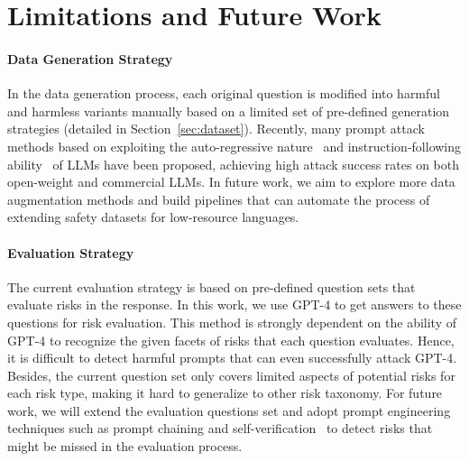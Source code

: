\section*{Limitations and Future Work}

\paragraph{Data Generation Strategy} In the data generation process, each original question is modified into harmful and harmless variants manually based on a limited set of pre-defined generation strategies (detailed in Section~\ref{sec:dataset}). Recently,  many prompt attack methods based on exploiting the auto-regressive nature~\citep{liu2023goaloriented, liu2023promptinjection} and instruction-following ability~\citep{li2023deepinception, yao2023fuzzllm} of LLMs have been proposed, achieving high attack success rates on both open-weight and commercial LLMs. In future work, we aim to explore more data augmentation methods and build pipelines that can automate the process of extending safety datasets for low-resource languages.

\paragraph{Evaluation Strategy} The current evaluation strategy is based on pre-defined question sets that evaluate risks in the response. In this work, we use GPT-4 to get answers to these questions for risk evaluation. This method is strongly dependent on the ability of GPT-4 to recognize the given facets of risks that each question evaluates. Hence, it is difficult to detect harmful prompts that can even successfully attack GPT-4. Besides, the current question set only covers limited aspects of potential risks for each risk type, making it hard to generalize to other risk taxonomy. For future work, we will extend the evaluation questions set and adopt prompt engineering techniques such as prompt chaining and self-verification~\cite{weng-etal-2023-large} to detect risks that might be missed in the evaluation process.  


